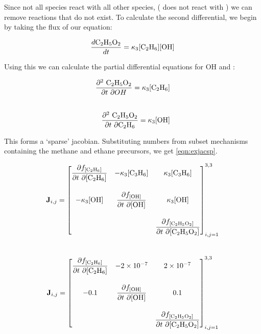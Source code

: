 Since not all species react with all other species, ( does not react with ) we can remove reactions that do not exist. To calculate the second differential, we begin by taking the flux of our equation:

\begin{equation}
    \frac{d\ce{C2H5O2}}{dt} = \kappa_3 [\ce{C2H6}][\ce{OH}]
\end{equation}

Using this we can calculate the partial differential equations for OH and :

\begin{eqnarray}
    \frac{\partial ^2 \ \ce{C2H5O2} }{\partial t \ \partial OH} = \kappa_3 [\ce{C2H6}] \\[20pt]
    \frac{\partial ^2 \ \ce{C2H5O2} }{\partial t \ \partial \ce{C2H6}} = \kappa_3 [\ce{OH}]
\end{eqnarray}


This forms a `sparse' jacobian. Substituting numbers from subset mechanisms containing the methane and ethane precursors, we get \autoref{eqn:exjacsp}.





\begin{eqnarray}
 \mathbf{J}_{i,j} =
\begin{bmatrix}
\dfrac{\partial f_{[\ce{C2H6}]}}{\partial t \ \partial {[\ce{C2H6}]}} &
  - \kappa_3[\ce{C3H6}] &
  \kappa_3[\ce{C3H6}] \\[20pt]
-\kappa_3[\ce{OH}] &
  \dfrac{\partial f_{[\ce{OH}]}}{\partial t \ \partial {[\ce{OH}]}} &
\kappa_3[\ce{OH}] \\[20pt]
\  &
 \  &
  \dfrac{\partial f_{[\ce{C2H5O2}]}}{\partial t \ \partial {[\ce{C2H5O2}]}}
\end{bmatrix}_{i,j=1}^{3,3}
\label{eqn:exjacsppre}
\end{eqnarray}\\



   \begin{eqnarray}
    \mathbf{J}_{i,j} =
 \begin{bmatrix}
   \dfrac{\partial f_{[\ce{C2H6}]}}{\partial t \ \partial {[\ce{C2H6}]}} &
     - 2\times 10^{-7} &
     2\times 10^{-7} \\[20pt]
   -0.1 &
     \dfrac{\partial f_{[\ce{OH}]}}{\partial t \ \partial {[\ce{OH}]}} &
  0.1 \\[20pt]
   \  &
    \  &
     \dfrac{\partial f_{[\ce{C2H5O2}]}}{\partial t \ \partial {[\ce{C2H5O2}]}}
 \end{bmatrix}_{i,j=1}^{3,3}
 \label{eqn:exjacsp}
\end{eqnarray}\\

